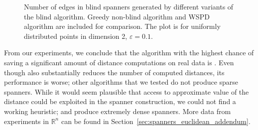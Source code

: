 \documentclass[]{ws-ijcga}
\newcommand{\eps}{\varepsilon}
\newcommand{\RR}{\mathbb{R}}
\def \expDistDataPath {./}
\begin{document}
\begin{figure}[!htbp]
    \begin{centering}
\end{centering}
    \caption{Number of edges in blind spanners generated by different variants of the blind
    algorithm. Greedy non-blind algorithm and WSPD algorithm are included for comparison. The plot is for uniformly distributed points
    in dimension 2, $\eps = 0.1$.}
    \label{fig:spanner_sparseness}
\end{figure}



From our experiments, we conclude that the algorithm with the highest chance
of saving a significant amount of distance computations on real data is \bgrdy. 
Even though \brndm also substantially reduces
the number of computed distances, its performance is worse;
other algorithms that we tested do not produce sparse spanners.
While it would seem plausible that access to approximate value of the distance
could be exploited in the spanner construction,
we could not find a working heuristic; \bqsgrdy and \bqsshaker produce extremely
dense spanners. More data from experiments in $\RR^n$ can be found in
Section~\ref{sec:spanners_euclidean_addendum}.
\end{document}
